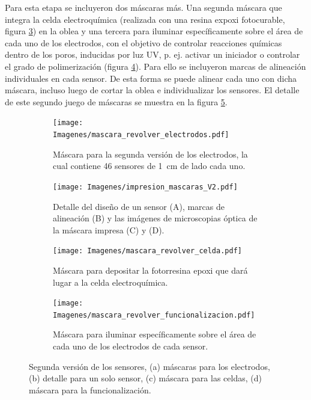 {		     Para esta etapa se incluyeron dos máscaras más. Una segunda máscara que integra la celda electroquímica (realizada con una resina expoxi fotocurable, figura \ref{fig:mascara_su8}) en la oblea y una tercera para iluminar específicamente sobre el área de cada uno de los electrodos, con el objetivo de controlar reacciones químicas dentro de los poros, inducidas por luz UV, p. ej. activar un iniciador o controlar el grado de polimerización  (figura \ref{fig:mascara_funcionalizacion}).\cite{Andrieu-Brunsen2015,Herzog2015} Para ello se incluyeron marcas de alineación individuales en cada sensor. De esta forma se puede alinear cada uno con dicha máscara, incluso luego de cortar la oblea e individualizar los sensores. El detalle de este segundo juego de máscaras se muestra en la figura \ref{fig:impresion_diseno_V2}.
					\begin{figure}[th!]
			 	   	    \centering
			 	   	    \begin{subfigure}[t]{0.495\textwidth}
			        	\texttt{[image: Imagenes/mascara\_revolver\_electrodos.pdf]}
			       		\caption{Máscara para la segunda versión de los electrodos, la cual contiene 46 sensores de \SI{1}{cm} de lado cada uno.}
			         	\label{fig:mascara_v2}
			     		\end{subfigure}
			     		\begin{subfigure}[t]{0.495\textwidth}
			     		\texttt{[image: Imagenes/impresion\_mascaras\_V2.pdf]}
			    		\caption{Detalle del diseño de un sensor (A), marcas de alineación (B) y las imágenes de microscopias óptica de la máscara impresa (C) y (D).}
			    		\label{fig:impresion_diseno_v2_b}	
						\end{subfigure}
			     		\begin{subfigure}[t]{0.495\textwidth}
			         	\texttt{[image: Imagenes/mascara\_revolver\_celda.pdf]}
			        	\caption{Máscara para depositar la fotorresina epoxi que dará lugar a la celda electroquímica.}
			         	\label{fig:mascara_su8}
			     		\end{subfigure}
						\begin{subfigure}[t]{0.495\textwidth}
			     		\texttt{[image: Imagenes/mascara\_revolver\_funcionalizacion.pdf]}
			        	\caption{Máscara para iluminar específicamente sobre el área de cada uno de los electrodos de cada sensor.}
			         	\label{fig:mascara_funcionalizacion}
			     		\end{subfigure}
			     		\caption[Juego de máscara. Segunda versión]{Segunda versión de los sensores, (a) máscaras  para los electrodos, (b) detalle para un solo sensor, (c) máscara para las celdas, (d) máscara para la funcionalización.}
			     		\label{fig:impresion_diseno_V2}
			     	   	\end{figure}
	
}
